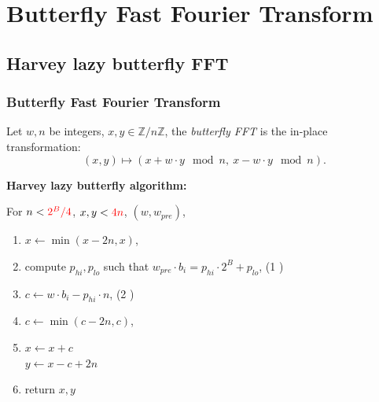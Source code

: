 \documentclass[10pt]{beamer}
\begin{document}
\section{Butterfly Fast Fourier Transform}
\subsection{Harvey lazy butterfly FFT}
\begin{frame}
    \frametitle{Butterfly Fast Fourier Transform}
    \begin{mybox}
    Let $w, n$ be integers, $x,y \in \mathbb{Z}/n\mathbb{Z}$, 
    the \textit{butterfly FFT} is the in-place transformation: 
    \[
    (x,y) \mapsto (x + w\cdot y \mod n,\ x - w\cdot y \mod n).
    \]
    \end{mybox}
    
    \pause
    \bigskip
    \textbf{Harvey lazy butterfly algorithm\cite{DBLP:journals/corr/abs-1205-2926}:}

    \medskip
    For $n < \textcolor{red}{2^B /4}$, $x,y < \textcolor{red}{4n}$, $(w, w_{pre})$,
    \begin{enumerate}
        \item $x \gets \min(x-2n, x)$,
        \item compute $p_{hi}, p_{lo}$ such that $w_{pre} \cdot b_i = p_{hi}\cdot 2^B + p_{lo}$, \hfill (1 )
        \item $c \gets w\cdot b_i - p_{hi}\cdot n$, \hfill (2 )
        \item $c \gets \min(c-2n, c)$,
        \item $x\gets x + c$ \\
            $y \gets x - c + 2n$
        \item return $x,y$
    \end{enumerate}

\end{frame}
\end{document}
